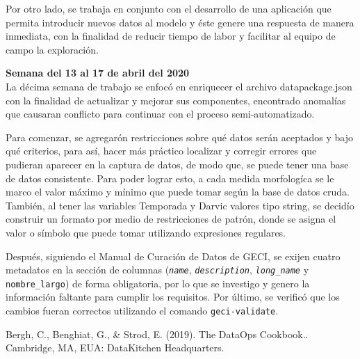 \documentclass{article}
\begin{document}
    Por otro lado, se trabaja en conjunto con el desarrollo de una aplicación que permita introducir nuevos datos al modelo y éste genere una respuesta de manera inmediata, con la finalidad de reducir tiempo de labor y  facilitar al equipo de campo la exploración.
    
    \textbf{Semana del 13 al 17 de abril del 2020} \\
    La décima semana de trabajo se enfocó en enriquecer el archivo datapackage.json con la finalidad de actualizar y mejorar sus componentes, encontrado anomalías que causaran conflicto para continuar con el proceso semi-automatizado.
    
    Para comenzar, se agregarón restricciones sobre qué datos serán aceptados y bajo qué criterios, para así, hacer más práctico localizar y corregir errores que pudieran aparecer en la captura de datos, de modo que, se puede tener una base de datos consistente. Para poder lograr esto, a cada medida morfologíca se le marco el valor máximo y mínimo que puede tomar según la base de datos cruda. También, al tener las variables Temporada y Darvic valores tipo string, se decidío construir un formato por medio de restricciones de patrón, donde se asigna el valor o símbolo que puede tomar utilizando expresiones regulares.
    
    Después, siguiendo el Manual de Curación de Datos de GECI, se exijen cuatro metadatos en la sección de columnas (\texttt{\textsl{name}}, \texttt{\textsl{description}}, \texttt{\textsl{long\_name}} y \texttt{nombre\_largo}) de forma obligatoria, por lo que se investigo y genero la información faltante para cumplir los requisitos. Por último, se verificó que los cambios fueran correctos utilizando el comando \texttt{geci-validate}.
    
\begin{thebibliography}{1} 
 Bergh, C., Benghiat, G., \& Strod, E. (2019). The DataOps Cookbook.. Cambridge, MA, EUA: DataKitchen Headquarters.
\end{thebibliography}
\end{document}
